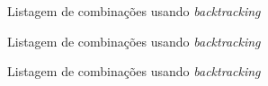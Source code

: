 \begin{frame}[fragile]{Listagem de combinações usando {\it backtracking}}
\end{frame}

\begin{frame}[fragile]{Listagem de combinações usando {\it backtracking}}
\end{frame}

\begin{frame}[fragile]{Listagem de combinações usando {\it backtracking}}
\end{frame}
